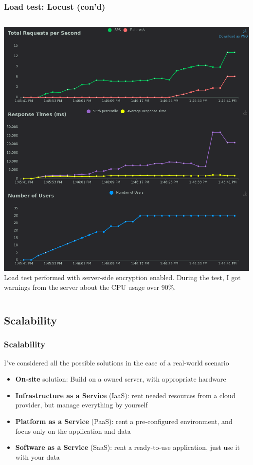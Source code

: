 \documentclass{beamer}
\begin{document}
\begin{frame}
    \frametitle{Load test: Locust (con'd)}
    
    \begin{columns}
        \vspace{-0.5em}
        \includegraphics[height=0.85\textheight]{images/ex1/30-users}
        Load test performed with server-side encryption enabled. \newline
        During the test, I got warnings from the server about the CPU usage over 90\%. \newline
    \end{columns}
 
\end{frame}

\subsection{Scalability}
\begin{frame}
    \frametitle{Scalability}
    I've considered all the possible solutions in the case of a real-world scenario
    \begin{itemize}
        \item \textbf{On-site} solution: Build on a owned server, with appropriate hardware
        \item \textbf{Infrastructure as a Service} (IaaS): rent needed resources from a cloud provider, but manage everything by yourself
        \item \textbf{Platform as a Service} (PaaS): rent a pre-configured environment, and focus only on the application and data
        \item \textbf{Software as a Service} (SaaS): rent a ready-to-use application, just use it with your data
    \end{itemize}
\end{frame}
\end{document}
